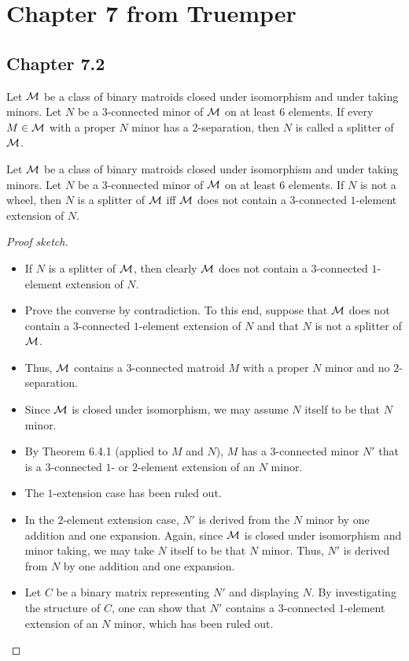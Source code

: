 \section{Chapter 7 from Truemper}

\subsection{Chapter 7.2}

\begin{definition}[splitter]
  \label{def:splitter}
  Let $\mathcal{M}$ be a class of binary matroids closed under isomorphism and under taking minors. Let $N$ be a $3$-connected minor of $\mathcal{M}$ on at least $6$ elements.
  If every $M \in \mathcal{M}$ with a proper $N$ minor has a $2$-separation, then $N$ is called a splitter of $\mathcal{M}$.
\end{definition}

\begin{theorem}
  \label{thm:7.2.1.a}
  Let $\mathcal{M}$ be a class of binary matroids closed under isomorphism and under taking minors. Let $N$ be a $3$-connected minor of $\mathcal{M}$ on at least $6$ elements.
  If $N$ is not a wheel, then $N$ is a splitter of $\mathcal{M}$ iff $\mathcal{M}$ does not contain a $3$-connected $1$-element extension of $N$.
\end{theorem}

\begin{proof}[Proof sketch]
  \begin{itemize}
    \item If $N$ is a splitter of $\mathcal{M}$, then clearly $\mathcal{M}$ does not contain a $3$-connected $1$-element extension of $N$.
    \item Prove the converse by contradiction. To this end, suppose that $\mathcal{M}$ does not contain a $3$-connected $1$-element extension of $N$ and that $N$ is not a splitter of $\mathcal{M}$.
    \item Thus, $\mathcal{M}$ contains a $3$-connected matroid $M$ with a proper $N$ minor and no $2$-separation.
    \item Since $\mathcal{M}$ is closed under isomorphism, we may assume $N$ itself to be that $N$ minor.
    \item By Theorem 6.4.1 (applied to $M$ and $N$), $M$ has a $3$-connected minor $N'$ that is a $3$-connected $1$- or $2$-element extension of an $N$ minor.
    \item The $1$-extension case has been ruled out.
    \item In the $2$-element extension case, $N'$ is derived from the $N$ minor by one addition and one expansion. Again, since $\mathcal{M}$ is closed under isomorphism and minor taking, we may take $N$ itself to be that $N$ minor. Thus, $N'$ is derived from $N$ by one addition and one expansion.
    \item Let $C$ be a binary matrix representing $N'$ and displaying $N$. By investigating the structure of $C$, one can show that $N'$ contains a $3$-connected $1$-element extension of an $N$ minor, which has been ruled out.
  \end{itemize}
\end{proof}

